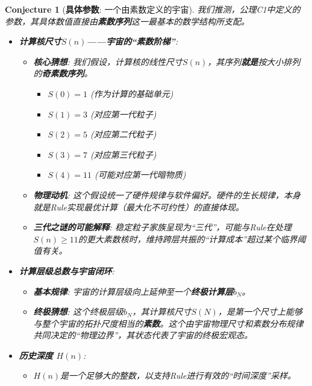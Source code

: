 \documentclass[11pt, a4paper]{article}
\newtheorem{conjecture}{Conjecture}[section] %
\begin{document}
\begin{conjecture}[\textbf{具体参数}: 一个由素数定义的宇宙]
我们推测，公理C1中定义的参数，其具体数值直接由\textbf{素数序列}这一最基本的数学结构所支配。
\begin{itemize}
    \item \textbf{计算核尺寸$S(n)$——宇宙的“素数阶梯”}:
    \begin{itemize}
        \item \textbf{核心猜想}: 我们假设，计算核的线性尺寸$S(n)$，其序列\textbf{就是}按大小排列的\textbf{奇素数序列}。
            \begin{itemize}
                \item $S(0) = 1$ (作为计算的基础单元)
                \item $S(1) = 3$ (对应第一代粒子)
                \item $S(2) = 5$ (对应第二代粒子)
                \item $S(3) = 7$ (对应第三代粒子)
                \item $S(4) = 11$ (可能对应第一代暗物质)
            \end{itemize}
        \item \textbf{物理动机}: 这个假设统一了硬件规律与软件偏好。硬件的生长规律，本身就是Rule实现最优计算（最大化不可约性）的直接体现。
        \item \textbf{三代之谜的可能解释}: 稳定粒子家族呈现为“三代”，可能与Rule在处理$S(n) \ge 11$的更大素数核时，维持跨层共振的“计算成本”超过某个临界阈值有关。
    \end{itemize}
    \item \textbf{计算层级总数与宇宙闭环}:
    \begin{itemize}
        \item \textbf{基本规律}: 宇宙的计算层级向上延伸至一个\textbf{终极计算层$b_N$}。
        \item \textbf{终极猜想}: 这个终极层级$b_N$，其计算核尺寸$S(N)$，是第一个尺寸上能够与整个宇宙的拓扑尺度相当的\textbf{素数}。这个由宇宙物理尺寸和素数分布规律共同决定的“物理边界”，其状态代表了宇宙的终极宏观态。
    \end{itemize}
    \item \textbf{历史深度 $H(n)$}:
    \begin{itemize}
        \item $H(n)$是一个足够大的整数，以支持Rule进行有效的“时间深度”采样。
    \end{itemize}
\end{itemize}
\end{conjecture}
\end{document}
